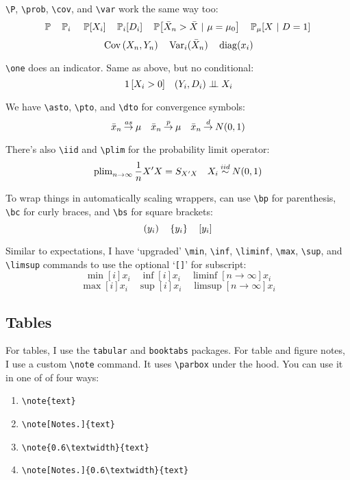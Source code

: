 \documentclass[12pt]{article}
\begin{document}
\texttt{\textbackslash P}, \texttt{\textbackslash prob}, \texttt{\textbackslash cov}, and \texttt{\textbackslash var} work the same way too:
$$\P \quad \P[i] \quad \P{X_i} \quad \P[i]{D_i} \quad \P{\bar{X}_n > \bar{X}}{\mu = \mu_0} \quad \P[\mu]{X}{D = 1}$$
$$\cov{X_n, Y_n} \quad \var[i](\bar{X}_n) \quad \diag{x_i}$$

\texttt{\textbackslash one} does an indicator. Same as above, but no conditional:
$$\one{X_i > 0} \quad (Y_i, D_i) \indep X_i$$

We have \texttt{\textbackslash asto}, \texttt{\textbackslash pto}, and \texttt{\textbackslash dto} for convergence symbols:
$$\bar{x}_n \mathbin{\overset{as}{\to}} \mu \quad \bar{x}_n \mathbin{\overset{p}{\to}} \mu \quad \bar{x}_n \mathbin{\overset{d}{\to}} N(0, 1)$$

There's also \texttt{\textbackslash iid} and \texttt{\textbackslash plim} for the probability limit operator:
$$\operatorname{plim}_{n\to \infty} \frac{1}{n} X' X = S_{X'X} \quad X_i \mathbin{\overset{iid}{\sim}} N(0, 1)$$

To wrap things in automatically scaling wrappers, can use \texttt{\textbackslash bp} for parenthesis, \texttt{\textbackslash bc} for curly braces, and \texttt{\textbackslash bs} for square brackets:
$$\left( y_i \right) \quad \left\lbrace y_i \right\rbrace \quad \left[ y_i \right]$$

Similar to expectations, I have `upgraded' \texttt{\textbackslash min}, \texttt{\textbackslash inf}, \texttt{\textbackslash liminf}, \texttt{\textbackslash max}, \texttt{\textbackslash sup}, and \texttt{\textbackslash limsup} commands to use the optional `\texttt{[]}' for subscript:
$$\min[i]{x_i} \quad \inf[i]{x_i} \quad \liminf[n \to \infty]{x_i}$$
$$\max[i]{x_i} \quad \sup[i]{x_i} \quad \limsup[n \to \infty]{x_i}$$


\subsection{Tables}

For tables, I use the \texttt{tabular} and \texttt{booktabs} packages. For table and figure notes, I use a custom \texttt{\textbackslash note} command. It uses \texttt{\textbackslash parbox} under the hood. You can use it in one of of four ways:
\begin{enumerate}
  \item \texttt{\textbackslash note\{text\}}
  \item \texttt{\textbackslash note[Notes.]\{text\}}
  \item \texttt{\textbackslash note\{0.6\textbackslash textwidth\}\{text\}}
  \item \texttt{\textbackslash note[Notes.]\{0.6\textbackslash textwidth\}\{text\}}
\end{enumerate}
\end{document}
